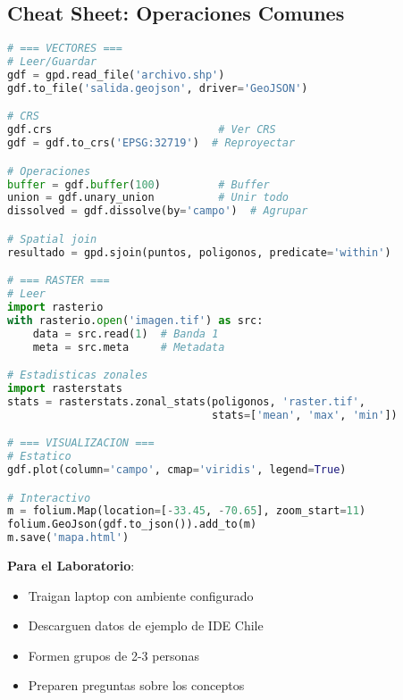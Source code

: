 \documentclass[11pt,a4paper]{article}
\newcommand{\importante}[1]{\begin{tcolorbox}[colback=yellow!10,colframe=orange,title={Importante}]#1\end{tcolorbox}}
\begin{document}
\subsection{Cheat Sheet: Operaciones Comunes}

\begin{lstlisting}[language=Python]
# === VECTORES ===
# Leer/Guardar
gdf = gpd.read_file('archivo.shp')
gdf.to_file('salida.geojson', driver='GeoJSON')

# CRS
gdf.crs                          # Ver CRS
gdf = gdf.to_crs('EPSG:32719')  # Reproyectar

# Operaciones
buffer = gdf.buffer(100)         # Buffer
union = gdf.unary_union          # Unir todo
dissolved = gdf.dissolve(by='campo')  # Agrupar

# Spatial join
resultado = gpd.sjoin(puntos, poligonos, predicate='within')

# === RASTER ===
# Leer
import rasterio
with rasterio.open('imagen.tif') as src:
    data = src.read(1)  # Banda 1
    meta = src.meta     # Metadata

# Estadisticas zonales
import rasterstats
stats = rasterstats.zonal_stats(poligonos, 'raster.tif', 
                                stats=['mean', 'max', 'min'])

# === VISUALIZACION ===
# Estatico
gdf.plot(column='campo', cmap='viridis', legend=True)

# Interactivo
m = folium.Map(location=[-33.45, -70.65], zoom_start=11)
folium.GeoJson(gdf.to_json()).add_to(m)
m.save('mapa.html')
\end{lstlisting}

\importante{
\textbf{Para el Laboratorio}:
\begin{itemize}
    \item Traigan laptop con ambiente configurado
    \item Descarguen datos de ejemplo de IDE Chile
    \item Formen grupos de 2-3 personas
    \item Preparen preguntas sobre los conceptos
\end{itemize}
}
\end{document}
